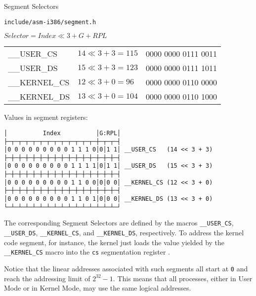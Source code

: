 \begin{frame}{Segment Selectors}
  \begin{block}{\texttt{include/asm-i386/segment.h}}
    \begin{center}
    \end{center}
  \end{block}
  \begin{block}{$Selector = Index \ll 3 + G + RPL$}
    \begin{center}{\ttfamily
      \begin{tabular}{lll}
        \_\_USER\_CS& $14 \ll 3 + 3 = 115$& 0000 0000 0111 0011\\
        \_\_USER\_DS& $15 \ll 3 + 3 = 123$& 0000 0000 0111 1011\\
        \_\_KERNEL\_CS&$12 \ll 3 + 0 = 96$& 0000 0000 0110 0000\\
        \_\_KERNEL\_DS&$13 \ll 3 + 0 = 104$&0000 0000 0110 1000
      \end{tabular}}
    \end{center}
  \end{block}
\end{frame}

Values in segment registers:

\verbatimfont{\dejavu}
\begin{verbatim}
│          Index          │G:RPL│
├─┬─┬─┬─┬─┬─┬─┬─┬─┬─┬─┬─┬─┼─┬─┬─┤
│0 0 0 0 0 0 0 0 0 1 1 1 0│0│1 1│ __USER_CS   (14 << 3 + 3)
├─┼─┼─┼─┼─┼─┼─┼─┼─┼─┼─┼─┼─┼─┼─┼─┤                          
│0 0 0 0 0 0 0 0 0 1 1 1 1│0│1 1│ __USER_DS   (15 << 3 + 3)
├─┼─┼─┼─┼─┼─┼─┼─┼─┼─┼─┼─┼─┼─┼─┼─┤                          
│0 0 0 0 0 0 0 0 0 1 1 0 0│0│0 0│ __KERNEL_CS (12 << 3 + 0)
├─┼─┼─┼─┼─┼─┼─┼─┼─┼─┼─┼─┼─┼─┼─┼─┤                          
│0 0 0 0 0 0 0 0 0 1 1 0 1│0│0 0│ __KERNEL_DS (13 << 3 + 0)
└─┴─┴─┴─┴─┴─┴─┴─┴─┴─┴─┴─┴─┴─┴─┴─┘
\end{verbatim}
  
The corresponding Segment Selectors are defined by the macros \texttt{\_\_USER\_CS},
\texttt{\_\_USER\_DS}, \texttt{\_\_KERNEL\_CS}, and \texttt{\_\_KERNEL\_DS}, respectively. To
address the kernel code segment, for instance, the kernel just loads the value yielded by
the \texttt{\_\_KERNEL\_CS} macro into the \texttt{cs} segmentation register .

Notice that the linear addresses associated with such segments all start at \texttt{0} and
reach the addressing limit of $2^{32}-1$. This means that all processes, either in User
Mode or in Kernel Mode, may use the same logical addresses.

